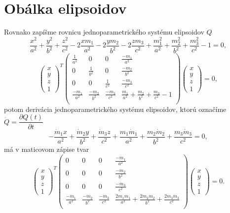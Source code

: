 \section{Obálka elipsoidov}
Rovnako zapíšme rovnicu jednoparametrického systému elipsoidov $Q$
$$ \frac{x^2}{a^2} + \frac{y^2}{b^2} + \frac{z^2}{c^2} - 2 \frac{xm_1}{a^2} - 2 \frac{ym_2}{b^2} - 2 \frac{zm_3}{c^2} + \frac{m_1^2}{a^2} + \frac{m_2^2}{b^2} + \frac{m_3^2}{c^2} - 1 = 0,$$
$$
\left(\begin{matrix} x \\ y \\ z  \\ 1
\end{matrix} \right)^T \left(\begin{matrix} 
\frac{1}{a^2} & 0 & 0 & \frac{-m_1}{a^2} \\
0 & \frac{1}{b^2} & 0 & \frac{-m_2}{b^2} \\
0 & 0 & \frac{1}{c^2} & \frac{-m_3}{c^2} \\
\frac{-m_1}{a^2} & \frac{-m_2}{b^2} & \frac{-m_3}{c^2} & \frac{m_1}{a^2} + \frac{m_2}{b^2} + \frac{m_3}{c^2} - 1 \\
\end{matrix} \right)\left(\begin{matrix} x \\ y \\ z \\ 1
\end{matrix} \right) = 0,
$$
potom derivácia jednoparametrického systému elipsoidov, ktorú označíme $\dot{Q} = \dfrac{\partial Q(t)}{\partial t}$
$$
-\frac{\dot{m}_1x}{a^2} + \frac{\dot{m}_2y}{b^2} + \frac{\dot{m}_3z}{c^2} + \frac{m_1\dot{m}_1}{a^2} + \frac{m_2 \dot{m}_2}{b^2} + \frac{m_3 \dot{m}_3}{c^2} = 0,
$$
má v maticovom zápise tvar
$$
\left(\begin{matrix} x \\ y \\ z  \\ 1
\end{matrix} \right)^T \left(\begin{matrix} 
0 & 0 & 0 & \frac{-\dot{m}_1}{a^2} \\
0 & 0 & 0 & \frac{-\dot{m}_2}{b^2} \\
0 & 0 & 0 & \frac{-\dot{m}_3}{c^2} \\
\frac{-\dot{m}_1}{a^2} & \frac{-\dot{m}_2}{b^2} & \frac{-\dot{m}_3}{c^2} & \frac{2m_1\dot{m}_1}{a^2} + \frac{2m_2 \dot{m}_2}{b^2} + \frac{2m_3 \dot{m}_3}{c^2}\\
\end{matrix} \right)\left(\begin{matrix} x \\ y \\ z \\ 1
\end{matrix} \right) = 0.
$$

